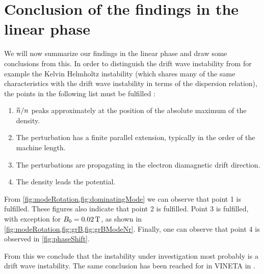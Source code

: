 \section{Conclusion of the findings in the linear phase}
%
We will now summarize our findings in the linear phase and draw some conclusions from this.
In order to distinguish the drift wave instability from for example the Kelvin Helmholtz instability (which shares many of the same characteristics with the drift wave instability in terms of the dispersion relation), the points in the following list must be fulfilled \cite{Jassby1972,Hendel1968}:
%
\begin{enumerate}[noitemsep]
    \item $\widetilde{ n}/n$ peaks approximately at the position of the absolute maximum of the density.
    \item The perturbation has a finite parallel extension, typically in the order of the machine length.
    \item The perturbations are propagating in the electron diamagnetic drift direction.
    \item The density leads the potential.
\end{enumerate}
%
From \cref{fig:modeRotation,fig:dominatingMode} we can observe that point 1 is fulfilled.
These figures also indicate that point 2 is fulfilled.
Point 3 is fulfilled, with exception for $B_0=0.02\, \text{T}$, as shown in \cref{fig:modeRotation,fig:grB,fig:grBModeNr}.
Finally, one can observe that point 4 is observed in \cref{fig:phaseShift}.

From this we conclude that the instability under investigation most probably is a drift wave instability.
The same conclusion has been reached for in VINETA in \cite{Schroder2005}.
